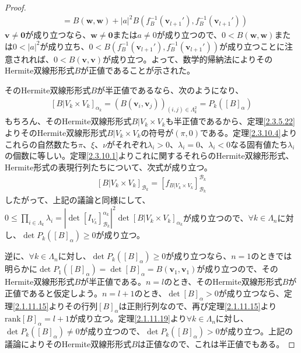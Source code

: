 \documentclass[dvipdfmx]{jsarticle}
\begin{document}
\begin{proof}
\begin{align*}
&= B\left( \mathbf{w},\mathbf{w} \right) + |a|^{2}B\left( f_{B}^{- 1}\left( \mathbf{v}_{l + 1}' \right),f_{B}^{- 1}\left( \mathbf{v}_{l + 1}' \right) \right)
\end{align*}
$\mathbf{v} \neq \mathbf{0}$が成り立つなら、$\mathbf{w} \neq \mathbf{0}$または$a \neq 0$が成り立つので、$0 < B\left( \mathbf{w},\mathbf{w} \right)$または$0 < |a|^{2}$が成り立ち、$0 < B\left( f_{B}^{- 1}\left( \mathbf{v}_{l + 1}' \right),f_{B}^{- 1}\left( \mathbf{v}_{l + 1}' \right) \right)$が成り立つことに注意されれば、$0 < B\left( \mathbf{v},\mathbf{v} \right)$が成り立つ。よって、数学的帰納法によりそのHermite双線形形式$B$が正値であることが示された。\par
そのHermite双線形形式$B$が半正値であるなら、次のようになり、
\begin{align*}
\left[ B|V_{k} \times V_{k} \right]_{\alpha_{k}} = \left( B\left( \mathbf{v}_{i},\mathbf{v}_{j} \right) \right)_{(i,j) \in \varLambda_{k}^{2}} = P_{k}\left( [ B]_{\alpha} \right)
\end{align*}
もちろん、そのHermite双線形形式$B|V_{k} \times V_{k}$も半正値であるから、定理\ref{2.3.5.22}よりそのHermite双線形形式$B|V_{k} \times V_{k}$の符号が$(\pi,0)$である。定理\ref{2.3.10.4}よりこれらの自然数たち$\pi$、$\xi$、$\nu$がそれぞれ$\lambda_{i} > 0$、$\lambda_{i} = 0$、$\lambda_{i} < 0$なる固有値たち$\lambda_{i}$の個数に等しい。定理\ref{2.3.10.1}よりこれに関するそれらのHermite双線形形式、Hermite形式の表現行列たちについて、次式が成り立つ。
\begin{align*}
\left[ B|V_{k} \times V_{k} \right]_{\mathcal{B}_{k}} = \left[ f_{B|V_{k} \times V_{k}} \right]_{\mathcal{B}_{k}}^{\mathcal{B}_{k}}
\end{align*}
したがって、上記の議論と同様にして、$0 \leq \prod_{i \in \varLambda_{k}} \lambda_{i} = \left| \det\left[ I_{V_{k}} \right]_{\mathcal{B}_{k}}^{\alpha_{k}} \right|^{2}\det\left[ B|V_{k} \times V_{k} \right]_{\alpha_{k}}$が成り立つので、$\forall k \in \varLambda_{n}$に対し、$\det{P_{k}\left( [ B]_{\alpha} \right)} \geq 0$が成り立つ。\par
逆に、$\forall k \in \varLambda_{n}$に対し、$\det{P_{k}\left( [ B]_{\alpha} \right)} \geq 0$が成り立つなら、$n = 1$のときでは明らかに$\det{P_{1}\left( [ B]_{\alpha} \right)} = \det[ B]_{\alpha} = B\left( \mathbf{v}_{1},\mathbf{v}_{1} \right)$が成り立つので、そのHermite双線形形式$B$が半正値である。$n = l$のとき、そのHermite双線形形式$B$が正値であると仮定しよう。$n = l + 1$のとき、$\det[ B]_{\alpha} > 0$が成り立つなら、定理\ref{2.1.11.15}よりその行列$[ B]_{\alpha}$は正則行列なので、再び定理\ref{2.1.11.15}より$\mathrm{rank}[ B]_{\alpha} = l + 1$が成り立つ。定理\ref{2.1.11.19}より$\forall k \in \varLambda_{n}$に対し、$\det{P_{k}\left( [ B]_{\alpha} \right)} \neq 0$が成り立つので、$\det{P_{k}\left( [ B]_{\alpha} \right)} > 0$が成り立つ。上記の議論によりそのHermite双線形形式$B$は正値なので、これは半正値でもある。\par

\end{proof}
\end{document}
